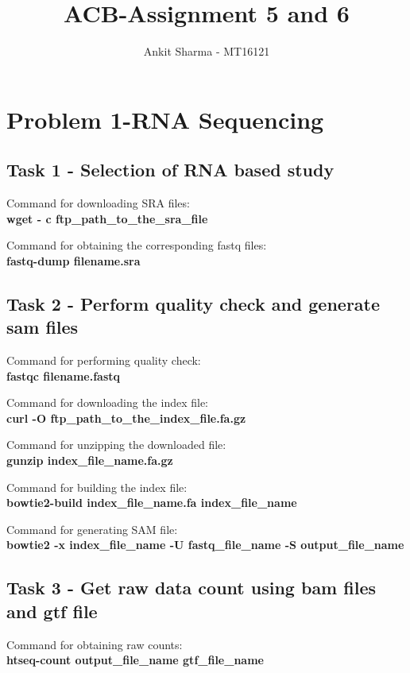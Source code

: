 \documentclass[11pt]{article}
\begin{document}
\author{Ankit Sharma - MT16121}
\title{ACB-Assignment 5 and 6}
\maketitle

\section{Problem 1-RNA Sequencing\cite{doi:10.1093/nar/gkq041}}

\subsection{Task 1 - Selection of RNA based study}
Command for downloading SRA files:\\
\textbf{wget - c ftp\_path\_to\_the\_sra\_file}

Command for obtaining the corresponding fastq files:\\
\textbf{fastq-dump filename.sra}

\subsection{Task 2 - Perform quality check and generate sam files}
Command for performing quality check:\\
\textbf{fastqc filename.fastq} 

Command for downloading the index file:\\
\textbf{curl -O ftp\_path\_to\_the\_index\_file.fa.gz}

Command for unzipping the downloaded file:\\
\textbf{gunzip index\_file\_name.fa.gz}

Command for building the index file:\\
\textbf{bowtie2-build index\_file\_name.fa index\_file\_name}

Command for generating SAM file:\\
\textbf{bowtie2 -x index\_file\_name -U fastq\_file\_name -S output\_file\_name}

\subsection{Task 3 - Get raw data count using bam files and gtf file}

Command for obtaining raw counts:\\
\textbf{htseq-count output\_file\_name gtf\_file\_name}
\end{document}

